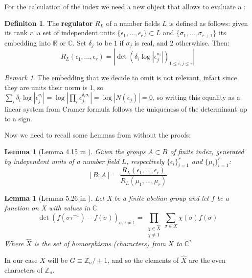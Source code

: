 \documentclass[]{article}
\theoremstyle{plain}
\newtheorem{lem}[teo]{Lemma}
\theoremstyle{remark}
\newtheorem{rem}{Remark}
\theoremstyle{definition}
\newtheorem{deff}[teo]{Definiton}
\newcommand{\Z}{\mathbb{Z}}
\newcommand{\C}{\mathbb{C}}
\newcommand{\R}{\mathbb{R}}
\begin{document}
	For the calculation of the index we need a new object that allows to evaluate a :
	\begin{deff}
		The \textbf{regulator} $ R_L $ of a number fields $ L $ is defined as follows:
		given its rank $ r $, a set of independent units $ \{\epsilon_1 , ... , \epsilon_r\} \subset L$ and $ \{ \sigma_1 , ... , \sigma_{r+1} \} $ its embedding into $ \R $ or $ \C $. Set $ \delta_j $ to be $ 1 $ if $ \sigma_j $ is real, and $ 2 $ otherwhise. \newline
		Then:
		\begin{equation}
			R_L(\epsilon_1 , ... , \epsilon_r) = | \det (\delta_i \log | \epsilon_j ^{\sigma_i}|)_{1\leq i,j\leq r} |
		\end{equation}
	\end{deff}
	
	\begin{rem} \label{rem:reg}
		The embedding that we decide to omit is not relevant, infact since they are units their norm is 1, so $ \sum_i  \delta_i \log | \epsilon_j ^{\sigma_i}| =\log | \prod_i \epsilon_j^{\delta_i \sigma_i }|=\log |N(\epsilon_j)| = 0$, so writing this equality as a linear system from Cramer formula follows the uniqueness of the determinant up to a sign. %
	\end{rem}

	Now we need to recall some Lemmas from \cite{CF} without the proofs: 
	
	\begin{lem}[Lemma 4.15 in \cite{CF}]
		\label{lem:index_reg}
		Given the groups $ A \subset B $ of finite index, generated by independent units of a number field $ L $, respectively $ \{\epsilon_i\}_{i=1}^r $ and $ \{\mu_i\}_{i=1}^r $:
		\begin{equation} \label{eq:index_reg}
			[B:A]= \frac{R_L(\epsilon_1 , ... , \epsilon_r) }{R_L(\mu_1 , ... , \mu_r) }
		\end{equation}
	\end{lem}

	\begin{lem}[Lemma 5.26 in \cite{CF}] 
		\label{lem:det}
		Let \textit{X} be a finite abelian group and let $ f $ be a function on \textit{X} with values in $ \C $
		\begin{equation}\label{eq:det}
			\det (f (\sigma \tau ^{-1}) - f (\sigma))_{\sigma , \tau \neq 1 } = \prod_{\substack{\chi \in \hat{X} \\ \chi \neq 1}}  \sum_{\sigma \in X} \chi(\sigma)f(\sigma)
		\end{equation}
		Where $ \hat{X} $ is the set of homorphisms (characters) from $ X $ to $ \C ^\ast $
	\end{lem}
	In our case $ X $  will be $ G \equiv \Z_n / \pm 1 $, and so the elements of $ \hat{X} $ are the even characters of $ \Z_n $. 
	
\end{document}
